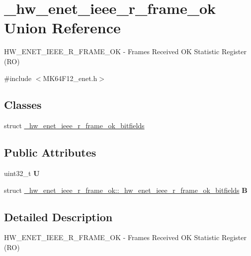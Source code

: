 \hypertarget{union__hw__enet__ieee__r__frame__ok}{}\section{\+\_\+hw\+\_\+enet\+\_\+ieee\+\_\+r\+\_\+frame\+\_\+ok Union Reference}
\label{union__hw__enet__ieee__r__frame__ok}


H\+W\+\_\+\+E\+N\+E\+T\+\_\+\+I\+E\+E\+E\+\_\+\+R\+\_\+\+F\+R\+A\+M\+E\+\_\+\+OK -\/ Frames Received OK Statistic Register (RO)  




{\ttfamily \#include $<$M\+K64\+F12\+\_\+enet.\+h$>$}

\subsection*{Classes}
\begin{DoxyCompactItemize}
\item 
struct \hyperlink{struct__hw__enet__ieee__r__frame__ok_1_1__hw__enet__ieee__r__frame__ok__bitfields}{\+\_\+hw\+\_\+enet\+\_\+ieee\+\_\+r\+\_\+frame\+\_\+ok\+\_\+bitfields}
\end{DoxyCompactItemize}
\subsection*{Public Attributes}
\begin{DoxyCompactItemize}
\item 
uint32\+\_\+t {\bfseries U}\hypertarget{union__hw__enet__ieee__r__frame__ok_a0a62e3519181ecdb0f0c1edf3f6ce05b}{}\label{union__hw__enet__ieee__r__frame__ok_a0a62e3519181ecdb0f0c1edf3f6ce05b}

\item 
struct \hyperlink{struct__hw__enet__ieee__r__frame__ok_1_1__hw__enet__ieee__r__frame__ok__bitfields}{\+\_\+hw\+\_\+enet\+\_\+ieee\+\_\+r\+\_\+frame\+\_\+ok\+::\+\_\+hw\+\_\+enet\+\_\+ieee\+\_\+r\+\_\+frame\+\_\+ok\+\_\+bitfields} {\bfseries B}\hypertarget{union__hw__enet__ieee__r__frame__ok_a1c914e5ec8660f03fb72cfd080f4693f}{}\label{union__hw__enet__ieee__r__frame__ok_a1c914e5ec8660f03fb72cfd080f4693f}

\end{DoxyCompactItemize}


\subsection{Detailed Description}
H\+W\+\_\+\+E\+N\+E\+T\+\_\+\+I\+E\+E\+E\+\_\+\+R\+\_\+\+F\+R\+A\+M\+E\+\_\+\+OK -\/ Frames Received OK Statistic Register (RO) 

